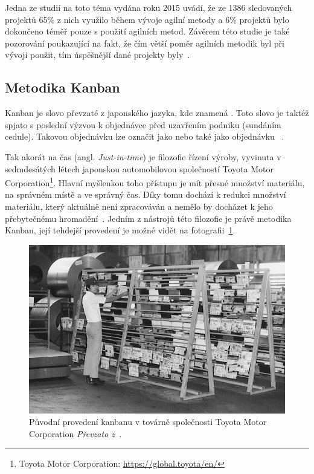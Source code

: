 Jedna ze studií na toto téma vydána roku 2015 uvádí, že ze 1386 sledovaných projektů 65\% z nich využilo během vývoje agilní metody a 6\% projektů bylo dokončeno téměř pouze s použití agilních metod. Závěrem této studie je také pozorování poukazující na fakt, že čím větší poměr agilních metodik byl při vývoji použit, tím úspěšnější dané projekty byly~\cite{bib:agile-work}.

\subsection{Metodika Kanban}
Kanban je slovo převzaté z japonského jazyka, kde znamená . Toto slovo je taktéž spjato s poslední výzvou k objednávce před uzavřením podniku (sundáním cedule). Takovou objednávku lze označit jako  nebo také jako objednávku ~\cite{bib:dict-kanban}. 

Tak akorát na čas (angl. \emph{Just-in-time}) je filozofie řízení výroby, vyvinuta v sedmdesátých létech japonskou automobilovou společností Toyota Motor Corporation\footnote{Toyota Motor Corporation: \url{https://global.toyota/en/}}. Hlavní myšlenkou toho přístupu je mít přesné množství materiálu, na správném místě a ve správný čas. Díky tomu dochází k redukci množství materiálu, který aktuálně není zpracováván a nemělo by docházet k jeho přebytečnému hromadění~\cite{bib:just-in-time}. Jedním z nástrojů této filozofie je právě metodika Kanban, její tehdejší provedení je možné vidět na fotografii~\ref{img:kanban-toyota}.

\begin{figure}[H]
	\centering
	\includegraphics[width=\textwidth]{obrazky-figures/toyota-kanban.jpg}
	\caption{Původní provedení kanbanu v továrně společnosti Toyota Motor Corporation \emph{Převzato z~\cite{bib:toyota-history}}.}
	\label{img:kanban-toyota}
\end{figure}

